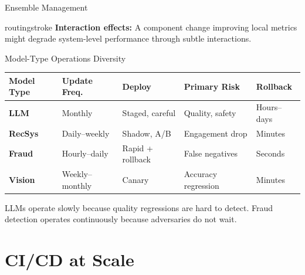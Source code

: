 \documentclass[aspectratio=169, 12pt]{beamer}
\begin{document}
\begin{frame}{Ensemble Management}
\vspace{0.15cm}
\begin{mlsyscard}{routingstroke}
{\footnotesize\textbf{Interaction effects:} A component change improving local metrics might degrade system-level performance through subtle interactions.}
\end{mlsyscard}

\end{frame}

\begin{frame}{Model-Type Operations Diversity}

\footnotesize
\renewcommand{\arraystretch}{1.15}
\begin{tabular}{@{}lllll@{}}
  \toprule
  \textbf{Model Type} & \textbf{Update Freq.} & \textbf{Deploy} & \textbf{Primary Risk} & \textbf{Rollback} \\
  \midrule
  \textbf{LLM}   & Monthly     & Staged, careful  & Quality, safety     & Hours--days \\
  \textbf{RecSys} & Daily--weekly & Shadow, A/B     & Engagement drop     & Minutes \\
  \textbf{Fraud}  & Hourly--daily & Rapid + rollback & False negatives     & Seconds \\
  \textbf{Vision} & Weekly--monthly & Canary         & Accuracy regression & Minutes \\
  \bottomrule
\end{tabular}

\vspace{0.15cm}

\vspace{0.1cm}
{\footnotesize LLMs operate slowly because quality regressions are hard to detect. Fraud detection operates continuously because adversaries do not wait.}

\end{frame}

\section{CI/CD at Scale}
\end{document}
